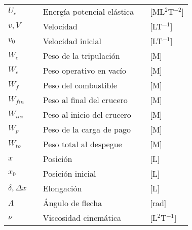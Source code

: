 \begin{longtable*}{p{20mm} c p{80mm} c p{40mm} }
$U_e$ 			&& Energía potencial elástica   && [ML$^2$T$^{-2}$]\\
$v, V$ 			&& Velocidad                    && [LT$^{-1}$]\\
$v_0$ 			&& Velocidad inicial            && [LT$^{-1}$]\\
$W_{c}$ 		&& Peso de la tripulación       && [M]\\
$W_{e}$	    	&& Peso operativo en vacío      && [M]\\
$W_{f}$ 		&& Peso del combustible         && [M]\\
$W_{fin}$ 		&& Peso al final del crucero    && [M]\\
$W_{ini}$ 		&& Peso al inicio del crucero   && [M]\\
$W_{p}$		    && Peso de la carga de pago     && [M]\\
$W_{to}$ 		&& Peso total al despegue       && [M]\\
$x$ 		    && Posición                     && [L]\\
$x_0$ 		    && Posición inicial             && [L]\\
$\delta, \Delta x$ 		&& Elongación                   && [L]\\
$\Lambda$       && Ángulo de flecha             && [rad]\\
$\nu$ 		    && Viscosidad cinemática        && [L$^2$T$^{-1}$]\\

\end{longtable*}
